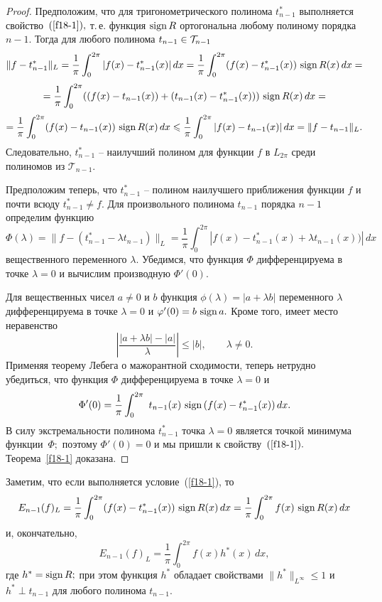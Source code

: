  \begin{proof}
 Предположим, что для
 тригонометрического полинома $t_{n-1}^{{*}}$ выполняется свойство~$(\ref{f18-1}),$
 т.\,е.  функция ${\rm sign \, } R$
 ортогональна  любому полиному порядка $n-1.$ Тогда  для любого полинома
 {$t_{n-1}\in {\cal T}_{n-1}$}
 $$
 \|f-t_{n-1}^{{*}}\|_L=\frac{1}{\pi}\int_0^{2\pi} |f(x)-t_{n-1}^{{*}}(x)|\, dx=
 \frac{1}{\pi}\int_0^{2\pi} (f(x)-t_{n-1}^{{*}}(x))\ {\rm sign \, } R(x)\, dx=
 $$
 $$
 =\frac{1}{\pi}\int_0^{2\pi} ((f(x)-{t}_{n-1}(x))+({t}_{n-1}(x)-t_{n-1}^{{*}}(x)))\
 {\rm sign \, } R(x)\, dx=
 $$
 $$
 =\frac{1}{\pi}\int_0^{2\pi} (f(x)-{t}_{n-1}(x))\ \sign R(x)\, dx\le
 \frac{1}{\pi}\int_0^{2\pi} |f(x)-{t}_{n-1}(x)|\, dx=\|f-{t}_{n-1}\|_L.
 $$
Следовательно, $t_{n-1}^{{*}}$ -- наилучший полином для функции $f$ в {$L_{2\pi}$
среди полиномов из $\mathcal{T}_{n-1}$.}

Предположим теперь, что $t_{n-1}^{{*}}$ -- полином наилучшего
приближения функции $f$ и почти всюду $t_{n-1}^{{*}}\ne f.$ Для произвольного полинома
${t}_{n-1}$ порядка $n-1$ определим функцию
$$
\Phi(\lambda)=\|f-(t_{n-1}^{{*}}-\lambda {t}_{n-1})\|_L=\frac{1}{\pi}\int_{0}^{2\pi}|f(x)
-t_{n-1}^{{*}}(x)+\lambda {t}_{n-1}(x))|\, dx
$$
вещественного переменного $\lambda.$
Убедимся, что функция $\Phi$ дифференцируема в точке $\lambda=0$ и
вычислим производную $\Phi'(0).$

Для вещественных чисел $a\ne 0$ и $b$ функция $\phi(\lambda)=|a+\lambda b|$ переменного
$\lambda$  дифференцируема в точке $\lambda=0$ и $\varphi'(0)=b\ {\rm sign \, } a.$ Кроме того,
имеет место неравенство
$$
\left|\frac{|a+\lambda b|-|a|}{\lambda}\right|\le |b|,\qquad \lambda\ne 0.
$$
Применяя теорему Лебега о мажорантной сходимости, теперь нетрудно убедиться, что функция
$\Phi$ дифференцируема  в точке $\lambda=0$ и
$$
\Phi'(0)=\frac{1}{\pi}\int_{0}^{2\pi}\  {t}_{n-1}(x)\ \sign (f(x)-t_{n-1}^{{*}}(x))\,dx.
$$
В силу экстремальности полинома $t_{n-1}^{{*}}$ точка $\lambda=0$ является точкой минимума
функции~$\Phi;$ поэтому  $\Phi'(0)=0$ и мы пришли к свойству~$(\ref{f18-1}).$
Теорема~\ref{f18-1} доказана.
\end{proof}

 Заметим, что если выполняется условие~(\ref{f18-1}), то
 $$
 E_{n-1}(f)_L=\frac{1}{\pi}\int_0^{2\pi} (f(x)-t_{n-1}^{{*}}(x))\ {\rm sign \, } R(x)\, dx=
 \frac{1}{\pi}\int_0^{2\pi} f(x)\ {\rm sign \, } R(x)\, dx
 $$
и, окончательно,
 \begin{equation}\label{f18-2}
 E_{n-1}(f)_L=\frac{1}{\pi}\int_0^{2\pi} f (x)h^*(x)\, dx,%
 \end{equation}
где $h^*={\rm sign \, } R;$ при этом функция $h^*$ обладает свойствами
$\|h^*\|_{{L^\infty}}\le 1$ и $h^*\perp {t}_{n-1}$ для любого полинома
$t_{n-1}.$




